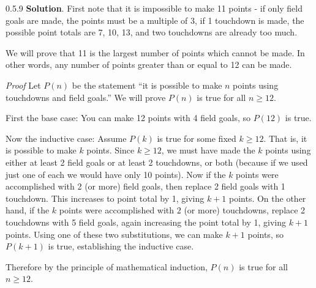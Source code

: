 \documentclass[11pt,]{book}
\makeatletter
\theoremstyle{ptxplainnotitle}
\theoremstyle{ptxplaintitle}
\renewcommand*{\proofname}{Proof}
\renewenvironment{proof}[1][\proofname]{\par
  \pushQED{\qed}%
  \normalfont \topsep6\p@\@plus6\p@\relax
  \trivlist
  \item\relax
    {\itshape
    #1\@addpunct{.}}\hspace\labelsep\ignorespaces
}{%
  \popQED\endtrivlist\@endpefalse
}
\theoremstyle{ptxdefinitionnotitle}
\theoremstyle{ptxdefinitiontitle}
\theoremstyle{ptxdefinitionnotitle}
\theoremstyle{ptxdefinitiontitle}
\theoremstyle{ptxdefinitionnotitle}
\theoremstyle{ptxdefinitiontitle}
\theoremstyle{ptxdefinitiontitlenonumber}
\theoremstyle{ptxdefinitiontitlenonumber}
\numberwithin{equation}{chapter}
\makeatother
\begin{document}
\begin{divisionexercise}{0.5.9}
\textbf{Solution}.\quad%
\hypertarget{p-637}{}%
First note that it is impossible to make 11 points - if only field goals are made, the points must be a multiple of 3, if 1 touchdown is made, the possible point totals are 7, 10, 13, \textellipsis{} and two touchdowns are already too much.%
\par
\hypertarget{p-638}{}%
We will prove that 11 is the largest number of points which cannot be made. In other words, any number of points greater than or equal to 12 can be made.%
\begin{proof}\hypertarget{proof-11}{}
\hypertarget{p-639}{}%
Let \(P(n)\) be the statement ``it is possible to make \(n\) points using touchdowns and field goals.'' We will prove \(P(n)\) is true for all \(n \ge 12\).%
\par
\hypertarget{p-640}{}%
First the base case: You can make 12 points with 4 field goals, so \(P(12)\) is true.%
\par
\hypertarget{p-641}{}%
Now the inductive case: Assume \(P(k)\) is true for some fixed \(k \ge 12\). That is, it is possible to make \(k\) points. Since \(k \ge 12\), we must have made the \(k\) points using either at least 2 field goals or at least 2 touchdowns, or both (because if we used just one of each we would have only 10 points). Now if the \(k\) points were accomplished with 2 (or more) field goals, then replace 2 field goals with 1 touchdown. This increases to point total by 1, giving \(k + 1\) points. On the other hand, if the \(k\) points were accomplished with \(2\) (or more) touchdowns, replace 2 touchdowns with 5 field goals, again increasing the point total by 1, giving \(k+1\) points. Using one of these two substitutions, we can make \(k+1\) points, so \(P(k+1)\) is true, establishing the inductive case.%
\par
\hypertarget{p-642}{}%
Therefore by the principle of mathematical induction, \(P(n)\) is true for all \(n \ge 12\).%
\end{proof}
\end{divisionexercise}%
\end{document}
